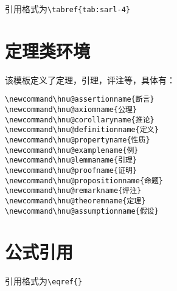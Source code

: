 引用格式为\lstinline!\tabref{tab:sarl-4}!

\section{定理类环境}
该模板定义了定理，引理，评注等，具体有：
\begin{lstlisting}
\newcommand\hnu@assertionname{断言}
\newcommand\hnu@axiomname{公理}
\newcommand\hnu@corollaryname{推论}
\newcommand\hnu@definitionname{定义}
\newcommand\hnu@propertyname{性质}
\newcommand\hnu@examplename{例}
\newcommand\hnu@lemmaname{引理}
\newcommand\hnu@proofname{证明}
\newcommand\hnu@propositionname{命题}
\newcommand\hnu@remarkname{评注}
\newcommand\hnu@theoremname{定理}
\newcommand\hnu@assumptionname{假设}
\end{lstlisting}

\section{公式引用}
引用格式为\lstinline!\eqref{}!

